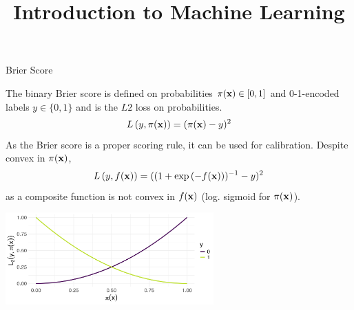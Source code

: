 \documentclass[11pt,compress,t,notes=noshow, xcolor=table]{beamer}
\title{Introduction to Machine Learning}
\begin{document}
    


\begin{vbframe}{Brier Score}

The binary Brier score is defined on probabilities $\pi(\mathbf{x}) \in [0, 1]$ and 0-1-encoded labels $y \in \{0, 1\}$ and is the $L2$ loss on probabilities.
\begin{equation*}
L\left(y, \pi(\mathbf{x})\right) = (\pi(\mathbf{x}) - y)^2
\end{equation*}
As the Brier score is a proper scoring rule, it can be used for calibration. %
Despite convex in $\pi(\mathbf{x})$, $$L\left(y, f(\mathbf{x})\right)=((1+\exp{(-f(\mathbf{x}))})^{-1}-y)^2$$ as a composite function is not convex in $f(\mathbf{x})$ (log. sigmoid for $\pi(\mathbf{x})$).
\vspace{-0.2cm}
\begin{center}
\includegraphics[width = 0.6\textwidth]{figure/brier.png}
\end{center}


\end{vbframe}
\end{document}
